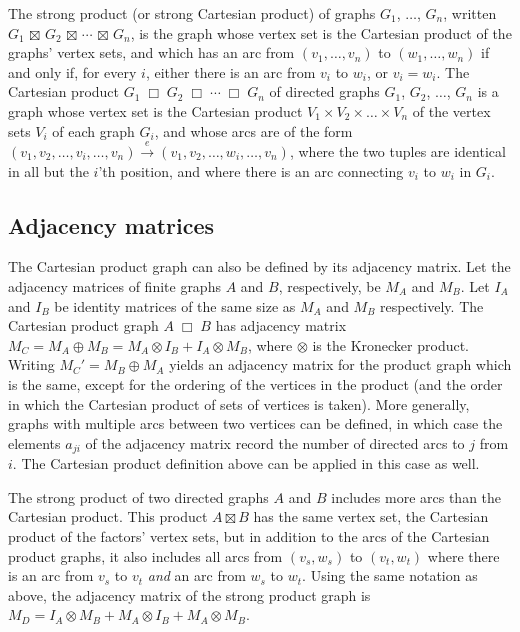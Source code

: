 \documentclass[review]{elsarticle}
\newcommand{\cartprod}{\;\Box\;}
\begin{document}
The strong product (or strong Cartesian product) of graphs $G_1$, $\ldots$, $G_n$, written
$G_1\,\boxtimes\,G_2\,\boxtimes\,\cdots\,\boxtimes\,G_n$, is
the graph whose vertex set is the Cartesian product of the graphs'
vertex sets, and which has an arc from
$(v_1,\ldots,v_n)$ to $(w_1,\ldots,w_n)$ if and only if, for
every $i$, either there is an arc from $v_i$ to $w_i$, or
$v_i=w_i$.
The Cartesian product
$G_1\cartprod G_2\cartprod\cdots\cartprod G_n$
of directed graphs
$G_1$, $G_2$, $\ldots$, $G_n$ is a graph whose vertex
set is the Cartesian product $V_1\times V_2\times\ldots\times V_n$
of the vertex sets $V_i$ of each graph $G_i$, and whose arcs
are of the form
$(v_1,v_2,\ldots,v_i,\ldots,v_n)\xrightarrow{e} (v_1,v_2,\ldots,w_i,\ldots,v_n)$,
where the two tuples are identical in all but the $i$'th position,
and where there is an arc connecting $v_i$ to $w_i$ in $G_i$.

\subsection{Adjacency matrices}
\label{app:graph-product-matrices}

The Cartesian product graph can also be defined by
its adjacency matrix.  
Let the adjacency matrices of finite graphs $A$ and $B$, respectively, be
$M_A$ and $M_B$.  Let $I_A$ and $I_B$ be identity matrices of the
same size as $M_A$ and $M_B$ respectively.
The Cartesian product graph $A\cartprod B$ has adjacency matrix
$M_C = M_A \oplus M_B = M_A \otimes I_B + I_A \otimes M_B$,
where $\otimes$ is the Kronecker product.
Writing $M_C'=M_B \oplus M_A$ yields an adjacency matrix for the product graph which is
the same, except for the ordering of the vertices in the product (and the order in
which the Cartesian product of sets of vertices is taken).
More generally, graphs with multiple arcs between two vertices can be defined,
in which case the elements $a_{ji}$ of
the adjacency matrix record the number of directed arcs to $j$ from $i$.
The Cartesian product definition
above can be applied in this case as well.

The strong product of two directed graphs $A$ and $B$
includes more arcs than the Cartesian product\cite{imrich-klavzar2000}.
This product $A\boxtimes B$ has the same vertex set,
the Cartesian product of the factors' vertex sets,
but in addition to the arcs of the Cartesian product graphs,
it also includes all arcs from $(v_s,w_s)$ to $(v_t,w_t)$
where there is an arc from $v_s$ to $v_t$ \emph{and} an arc
from $w_s$ to $w_t$.
Using the same notation as above, the adjacency matrix of
the strong product graph is
$M_D=I_A \otimes M_B + M_A \otimes I_B + M_A \otimes M_B$.
\end{document}
